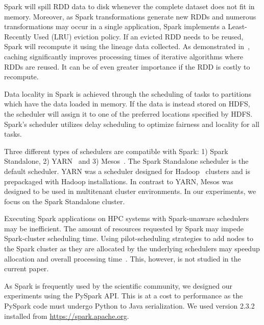 \documentclass{IEEEtran}
\begin{document}
Spark will spill RDD data to disk whenever the complete dataset does not fit in
memory. Moreover, as Spark transformations generate new RDDs and numerous 
transformations may occur in a single application, Spark implements a Least-Recently Used (LRU) eviction
policy. If an evicted RDD needs to be reused, Spark will recompute it using the
lineage data collected. As demonstrated in~\cite{freeman2014mapping
}, caching significantly improves processing times of iterative algorithms where 
RDDs are reused. It can be of even greater importance if the RDD is costly to 
recompute.

Data locality in Spark is achieved through the scheduling of tasks to partitions 
which have the
data loaded in memory. If the data is instead stored on HDFS, the scheduler will
assign it to one of the preferred locations specified by HDFS. Spark's scheduler
utilizes delay scheduling to optimize fairness and locality for all tasks.

Three different types of schedulers are compatible with Spark: 1) Spark 
Standalone, 2) YARN~\cite{vavilapalli2013apache} and 3) Mesos~\cite{hindman2011mesos}. The Spark Standalone
scheduler is the default scheduler. YARN was a scheduler designed for Hadoop~\cite{white2012hadoop}
clusters and is prepackaged with Hadoop installations. In contrast to YARN, 
Mesos was designed to be used in multitenant cluster environments. In our experiments,
we focus on the Spark Standalone cluster.

Executing Spark applications on HPC systems with Spark-unaware schedulers may
be inefficient. The amount of resources requested by Spark may impede 
Spark-cluster scheduling time. Using pilot-scheduling strategies to add 
nodes to the Spark cluster as they are allocated by the underlying 
schedulers may speedup allocation and overall processing time~\cite{paraskevakos2018pilot}. This, however, is not studied in the 
current paper.

As Spark is frequently used by the scientific community, we designed 
our experiments using the PySpark API. This is at a cost to performance 
as the PySpark code must undergo Python to Java serialization. We used 
version 2.3.2 installed from \url{https://spark.apache.org}.


\end{document}
